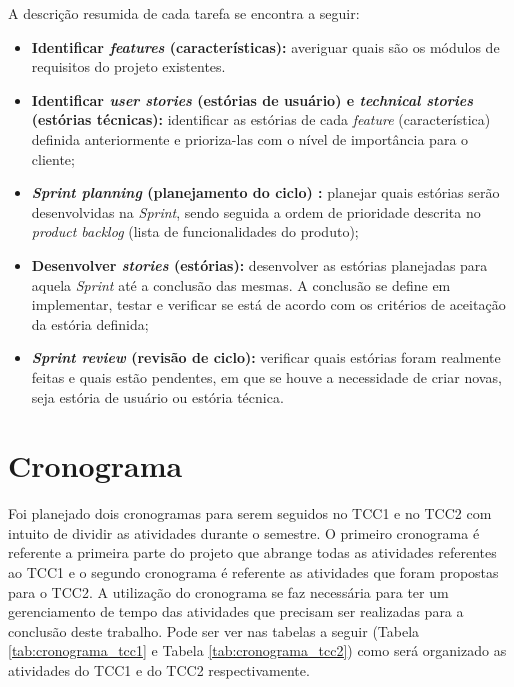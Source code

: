 A descrição resumida de cada tarefa se encontra a seguir:

\begin{itemize}
    \item \textbf{Identificar \textit{features} (características):} averiguar quais são os módulos de requisitos do projeto existentes.
    
    \item \textbf{Identificar \textit{user stories} (estórias de usuário) e \textit{technical stories} (estórias técnicas):} identificar as estórias de cada \textit{feature} (característica) definida anteriormente e prioriza-las com o nível de importância para o cliente;
    
    \item \textbf{\textit{Sprint planning} (planejamento do ciclo) :} planejar quais estórias serão desenvolvidas na \textit{Sprint}, sendo seguida a ordem de prioridade descrita no \textit{product backlog} (lista de funcionalidades do produto);
    
    \item \textbf{Desenvolver \textit{stories} (estórias):} desenvolver as estórias planejadas para aquela \textit{Sprint} até a conclusão das mesmas. A conclusão se define em implementar, testar e verificar se está de acordo com os critérios de aceitação da estória definida;
    
    \item \textbf{\textit{Sprint review} (revisão de ciclo):} verificar quais estórias foram realmente feitas e quais estão pendentes, em que se houve a necessidade de criar novas, seja estória de usuário ou estória técnica.
\end{itemize}

\section{Cronograma}

Foi planejado dois cronogramas para serem seguidos no TCC1 e no TCC2 com intuito de dividir as atividades durante o semestre. O primeiro cronograma é referente a primeira parte do projeto que abrange todas as atividades referentes ao TCC1 e o segundo cronograma é referente as atividades que foram propostas para o TCC2. A utilização do cronograma se faz necessária para ter um gerenciamento de tempo das atividades que precisam ser realizadas para a conclusão deste trabalho. Pode ser ver nas tabelas a seguir (Tabela \ref{tab:cronograma_tcc1} e Tabela \ref{tab:cronograma_tcc2}) como será organizado as atividades do TCC1 e do TCC2 respectivamente.

